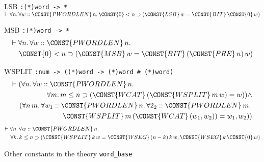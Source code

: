\begin{table}
\begin{center}
\begin{constants}
\item[LSB] \verb":(*)word -> *" \newline
        $\THM \FORALL n\DOT
        \FORALL w::\CONST{PWORDLEN} \,n\DOT
                 \CONST{0} \LES  n \IMP
                    (\CONST{LSB} \,w = \CONST{BIT} \,\CONST{0} \,w)$
\item[MSB] \verb":(*)word -> *"
\begin{eqnarray*}
\lefteqn{\THM \FORALL n\DOT
        \FORALL w::\CONST{PWORDLEN} \,n\DOT}\\
 & &             \CONST{0} \LES  n \IMP
                    (\CONST{MSB} \,w =
                        \CONST{BIT} \,(\CONST{PRE} \,n) \,w)
\end{eqnarray*}
\item[WSPLIT] \verb":num -> ((*)word -> (*)word # (*)word)"
\begin{eqnarray*}
\lefteqn{\THM (\FORALL n\DOT
         \FORALL w::\CONST{PWORDLEN} \,n.}\\
 & & {}\FORALL m\DOT m \LEE  n \IMP
       (\CONST{WCAT} \,(\CONST{WSPLIT} \,m \,w) = w)) \AND \\
 & &     (\FORALL n \,m\DOT
         \FORALL w_1 :: \CONST{PWORDLEN} \,n\DOT
         \FORALL 2_2 :: \CONST{PWORDLEN} \,m\DOT \\
 & & \quad \CONST{WSPLIT} \,m \,(\CONST{WCAT} \,(w_{1},w_{2})) = w_{1},w_{2}))
\end{eqnarray*}
\begin{eqnarray*}
\lefteqn{\THM \FORALL n\DOT
        \FORALL w ::\CONST{PWORDLEN} \,n\DOT}\\
 & & {}\FORALL k\DOT k \LEE  n \IMP
                        (\CONST{WSPLIT} \,k \,w =
                            \CONST{WSEG} \,(n - k) \,k \,w,
                            \CONST{WSEG} \,k \,\CONST{0} \,w)
\end{eqnarray*}
\end{constants}
\end{center}
\caption{Other constants in the theory {\tt word\_base}\label{tab-other-const}}
\end{table}

